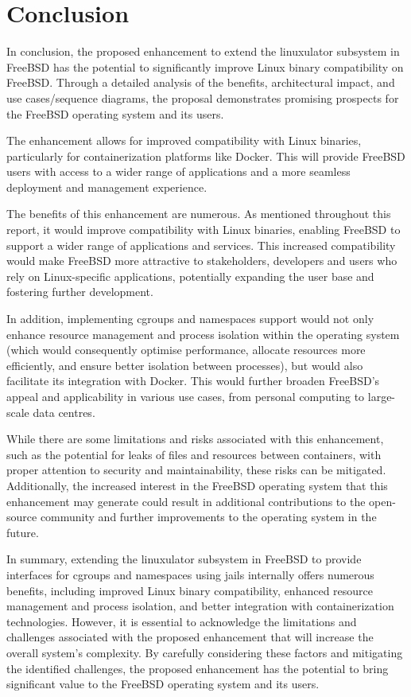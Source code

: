\documentclass[12pt, dvipsnames, a4paper]{article}
\begin{document}
\section{Conclusion}
In conclusion, the proposed enhancement to extend the linuxulator subsystem in FreeBSD has the potential to significantly improve Linux binary compatibility on FreeBSD. Through a detailed analysis of the benefits, architectural impact, and use cases/sequence diagrams, the proposal demonstrates promising prospects for the FreeBSD operating system and its users. 

The enhancement allows for improved compatibility with Linux binaries, particularly for containerization platforms like Docker. This will provide FreeBSD users with access to a wider range of applications and a more seamless deployment and management experience.

The benefits of this enhancement are numerous. As mentioned throughout this report, it would improve compatibility with Linux binaries, enabling FreeBSD to support a wider range of applications and services. This increased compatibility would make FreeBSD more attractive to stakeholders, developers and users who rely on Linux-specific applications, potentially expanding the user base and fostering further development.

In addition, implementing cgroups and namespaces support would not only enhance resource management and process isolation within the operating system (which would consequently optimise performance, allocate resources more efficiently, and ensure better isolation between processes), but would also facilitate its integration with Docker. This would further broaden FreeBSD’s appeal and applicability in various use cases, from personal computing to large-scale data centres.

While there are some limitations and risks associated with this enhancement, such as the potential for leaks of files and resources between containers, with proper attention to security and maintainability, these risks can be mitigated. Additionally, the increased interest in the FreeBSD operating system that this enhancement may generate could result in additional contributions to the open-source community and further improvements to the operating system in the future.

In summary, extending the linuxulator subsystem in FreeBSD to provide interfaces for cgroups and namespaces using jails internally offers numerous benefits, including improved Linux binary compatibility, enhanced resource management and process isolation, and better integration with containerization technologies. However, it is essential to acknowledge the limitations and challenges associated with the proposed enhancement that will increase the overall system’s complexity. By carefully considering these factors and mitigating the identified challenges, the proposed enhancement has the potential to bring significant value to the FreeBSD operating system and its users.
\end{document}
